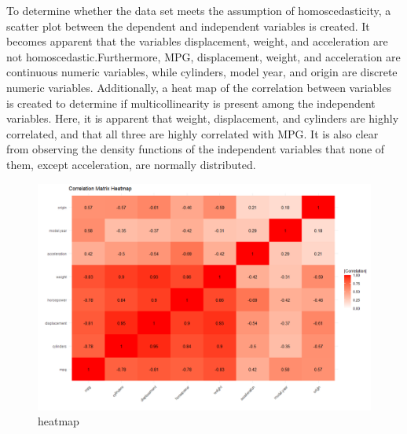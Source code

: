 


\lstset{style=mystyle}
	
	To determine whether the data set meets the assumption of homoscedasticity, a scatter plot between the dependent and independent variables is created. It becomes apparent that the variables displacement, weight, and acceleration are not homoscedastic.Furthermore, MPG, displacement, weight, and acceleration are continuous numeric variables, while cylinders, model year, and origin are discrete numeric variables. Additionally, a heat map of the correlation between variables is created to determine if multicollinearity is present among the independent variables. Here, it is apparent that weight, displacement, and cylinders are highly correlated, and that all three are highly correlated with MPG. It is also clear from observing the density functions of the independent variables that none of them, except acceleration, are normally distributed. 
%	



\begin{figure}[h] 
	\centering\includegraphics[width=14cm]{billder/1.png}
	\caption{heatmap}
	\label{fig:intro1}
\end{figure}


